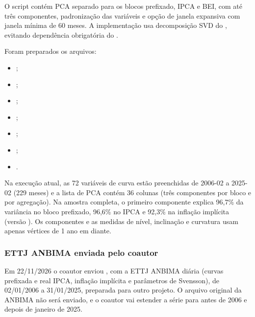 \documentclass[12pt,a4paper]{article}
\begin{document}
O script contém PCA separado para os blocos prefixado, IPCA e BEI, com até três
componentes, padronização das variáveis e opção de janela expansiva com janela
mínima de 60 meses. A implementação usa decomposição SVD do , evitando
dependência obrigatória do .

Foram preparados os arquivos:
\begin{itemize}[leftmargin=1.2cm]
    \item {};
    \item {};
    \item {};
    \item {};
    \item {};
    \item {};
    \item {}.
\end{itemize}

Na execução atual, as 72 variáveis de curva estão preenchidas de 2006-02 a 2025-02
(229 meses) e a lista de PCA contém 36 colunas (três componentes por bloco e por
agregação). Na amostra completa, o primeiro componente explica 96,7\% da variância
no bloco prefixado, 96,6\% no IPCA e 92,3\% na inflação implícita (versão
). Os componentes e as medidas de nível, inclinação e curvatura usam
apenas vértices de 1 ano em diante.

\subsubsection{ETTJ ANBIMA enviada pelo coautor}\label{sec:ettj}

Em 22/11/2026 o coautor enviou , com a ETTJ
ANBIMA diária (curvas prefixada e real IPCA, inflação implícita e parâmetros de
Svensson), de 02/01/2006 a 31/01/2025, preparada para outro projeto. O arquivo
original da ANBIMA não será enviado, e o coautor vai estender a série para antes de
2006 e depois de janeiro de 2025.
\end{document}
